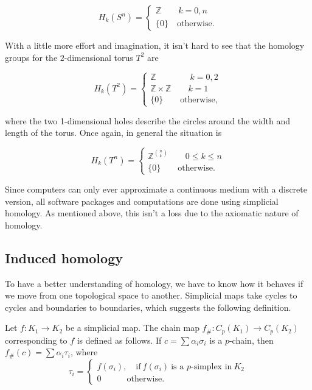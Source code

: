 \begin{equation*}
  H_{k}(S^{n}) = \begin{cases}
    \mathbb{Z} \qquad k = 0,n \\
    \{0\} \quad \text{otherwise}.
  \end{cases}
\end{equation*}

With a little more effort and imagination, it isn't hard to see that the homology groups for the $2$-dimensional torus $T^{2}$ are

\begin{equation*}
  H_{k}(T^{2}) = \begin{cases}
    \mathbb{Z} \qquad \qquad k = 0,2 \\
    \mathbb{Z} \times \mathbb{Z} \qquad k = 1 \\
    \{0\} \qquad \text{otherwise},
  \end{cases}
\end{equation*}

\noindent
where the two 1-dimensional holes describe the circles around the width and length of the torus. Once again, in general the situation is

\begin{equation*}
  H_{k}(T^{n}) = \begin{cases}
    \mathbb{Z}^{\binom{n}{k}} \qquad 0 \leq k \leq n  \\
    \{0\} \qquad \text{otherwise}.
  \end{cases}
\end{equation*}

Since computers can only ever approximate a continuous medium with a discrete version, all software packages and computations are done using simplicial homology. As mentioned above, this isn't a loss due to the axiomatic nature of homology.

\subsection{Induced homology}
To have a better understanding of homology, we have to know how it behaves if we move from one topological space to another. Simplicial maps take cycles to cycles and boundaries to boundaries, which suggests the following definition.

\begin{definition}
  Let $f:K_{1} \to K_{2}$ be a simplicial map. The chain map $f_{\#}: C_{p}(K_{1}) \to C_{p}(K_{2})$ corresponding to $f$ is defined as follows. If $c = \sum \alpha_{i}\sigma_{i}$ is a $p$-chain, then $f_{\#}(c) = \sum \alpha_{i} \tau_{i}$, where
  \begin{equation*}
    \tau_{i} =
    \begin{cases}
      f(\sigma_{i}), \quad \text{if} \: f(\sigma_{i}) \: \text{is a $p$-simplex in} \: K_{2} \\
      0 \qquad \quad \text{otherwise}.
    \end{cases}
  \end{equation*}
\end{definition}

